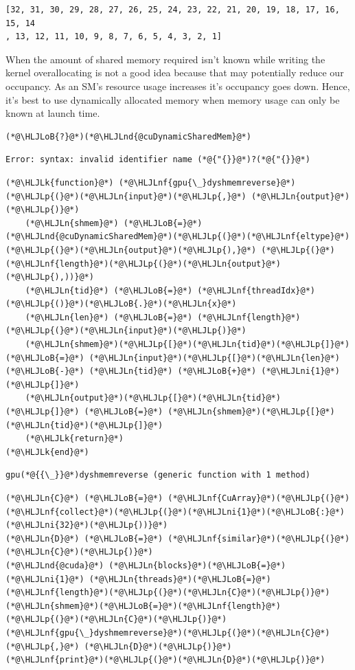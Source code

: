 \documentclass[12pt,a4paper]{article}
\newcommand{\HLJLk}[1]{\textcolor[RGB]{148,91,176}{\textbf{#1}}}
\newcommand{\HLJLn}[1]{#1}
\newcommand{\HLJLnd}[1]{\textcolor[RGB]{214,102,97}{#1}}
\newcommand{\HLJLnf}[1]{\textcolor[RGB]{66,102,213}{#1}}
\newcommand{\HLJLni}[1]{\textcolor[RGB]{59,151,46}{#1}}
\newcommand{\HLJLoB}[1]{\textcolor[RGB]{102,102,102}{\textbf{#1}}}
\newcommand{\HLJLp}[1]{#1}
\begin{document}
\begin{lstlisting}
[32, 31, 30, 29, 28, 27, 26, 25, 24, 23, 22, 21, 20, 19, 18, 17, 16, 15, 14
, 13, 12, 11, 10, 9, 8, 7, 6, 5, 4, 3, 2, 1]
\end{lstlisting}


When the amount of shared memory required isn't known while writing the kernel overallocating is not a good idea because that may potentially reduce our occupancy. As an SM's resource usage increases it's occupancy goes down. Hence, it's best to use dynamically allocated memory when memory usage can only be known at launch time.


\begin{lstlisting}
(*@\HLJLoB{?}@*)(*@\HLJLnd{@cuDynamicSharedMem}@*)
\end{lstlisting}

\begin{lstlisting}
Error: syntax: invalid identifier name (*@{"{}}@*)?(*@{"{}}@*)
\end{lstlisting}


\begin{lstlisting}
(*@\HLJLk{function}@*) (*@\HLJLnf{gpu{\_}dyshmemreverse}@*)(*@\HLJLp{(}@*)(*@\HLJLn{input}@*)(*@\HLJLp{,}@*) (*@\HLJLn{output}@*)(*@\HLJLp{)}@*)
    (*@\HLJLn{shmem}@*) (*@\HLJLoB{=}@*) (*@\HLJLnd{@cuDynamicSharedMem}@*)(*@\HLJLp{(}@*)(*@\HLJLnf{eltype}@*)(*@\HLJLp{(}@*)(*@\HLJLn{output}@*)(*@\HLJLp{),}@*) (*@\HLJLp{(}@*)(*@\HLJLnf{length}@*)(*@\HLJLp{(}@*)(*@\HLJLn{output}@*)(*@\HLJLp{),))}@*)
    (*@\HLJLn{tid}@*) (*@\HLJLoB{=}@*) (*@\HLJLnf{threadIdx}@*)(*@\HLJLp{()}@*)(*@\HLJLoB{.}@*)(*@\HLJLn{x}@*)
    (*@\HLJLn{len}@*) (*@\HLJLoB{=}@*) (*@\HLJLnf{length}@*)(*@\HLJLp{(}@*)(*@\HLJLn{input}@*)(*@\HLJLp{)}@*)
    (*@\HLJLn{shmem}@*)(*@\HLJLp{[}@*)(*@\HLJLn{tid}@*)(*@\HLJLp{]}@*) (*@\HLJLoB{=}@*) (*@\HLJLn{input}@*)(*@\HLJLp{[}@*)(*@\HLJLn{len}@*) (*@\HLJLoB{-}@*) (*@\HLJLn{tid}@*) (*@\HLJLoB{+}@*) (*@\HLJLni{1}@*)(*@\HLJLp{]}@*)
    (*@\HLJLn{output}@*)(*@\HLJLp{[}@*)(*@\HLJLn{tid}@*)(*@\HLJLp{]}@*) (*@\HLJLoB{=}@*) (*@\HLJLn{shmem}@*)(*@\HLJLp{[}@*)(*@\HLJLn{tid}@*)(*@\HLJLp{]}@*)
    (*@\HLJLk{return}@*)
(*@\HLJLk{end}@*)
\end{lstlisting}

\begin{lstlisting}
gpu(*@{{\_}}@*)dyshmemreverse (generic function with 1 method)
\end{lstlisting}


\begin{lstlisting}
(*@\HLJLn{C}@*) (*@\HLJLoB{=}@*) (*@\HLJLnf{CuArray}@*)(*@\HLJLp{(}@*)(*@\HLJLnf{collect}@*)(*@\HLJLp{(}@*)(*@\HLJLni{1}@*)(*@\HLJLoB{:}@*)(*@\HLJLni{32}@*)(*@\HLJLp{))}@*)
(*@\HLJLn{D}@*) (*@\HLJLoB{=}@*) (*@\HLJLnf{similar}@*)(*@\HLJLp{(}@*)(*@\HLJLn{C}@*)(*@\HLJLp{)}@*)
(*@\HLJLnd{@cuda}@*) (*@\HLJLn{blocks}@*)(*@\HLJLoB{=}@*)(*@\HLJLni{1}@*) (*@\HLJLn{threads}@*)(*@\HLJLoB{=}@*)(*@\HLJLnf{length}@*)(*@\HLJLp{(}@*)(*@\HLJLn{C}@*)(*@\HLJLp{)}@*) (*@\HLJLn{shmem}@*)(*@\HLJLoB{=}@*)(*@\HLJLnf{length}@*)(*@\HLJLp{(}@*)(*@\HLJLn{C}@*)(*@\HLJLp{)}@*) (*@\HLJLnf{gpu{\_}dyshmemreverse}@*)(*@\HLJLp{(}@*)(*@\HLJLn{C}@*)(*@\HLJLp{,}@*) (*@\HLJLn{D}@*)(*@\HLJLp{)}@*)
(*@\HLJLnf{print}@*)(*@\HLJLp{(}@*)(*@\HLJLn{D}@*)(*@\HLJLp{)}@*)
\end{lstlisting}
\end{document}
